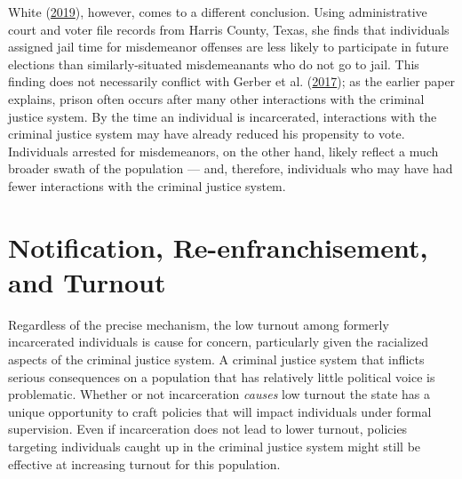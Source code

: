 \documentclass[
  12pt,
]{article}
\begin{document}
White (\protect\hyperlink{ref-White2019}{2019}), however, comes to a different conclusion. Using administrative court and voter file records from Harris County, Texas, she finds that individuals assigned jail time for misdemeanor offenses are less likely to participate in future elections than similarly-situated misdemeanants who do not go to jail. This finding does not necessarily conflict with Gerber et al. (\protect\hyperlink{ref-Gerber2017}{2017}); as the earlier paper explains, prison often occurs after many other interactions with the criminal justice system. By the time an individual is incarcerated, interactions with the criminal justice system may have already reduced his propensity to vote. Individuals arrested for misdemeanors, on the other hand, likely reflect a much broader swath of the population --- and, therefore, individuals who may have had fewer interactions with the criminal justice system.

\hypertarget{notification-re-enfranchisement-and-turnout}{%
\section*{Notification, Re-enfranchisement, and Turnout}\label{notification-re-enfranchisement-and-turnout}}

Regardless of the precise mechanism, the low turnout among formerly incarcerated individuals is cause for concern, particularly given the racialized aspects of the criminal justice system. A criminal justice system that inflicts serious consequences on a population that has relatively little political voice is problematic. Whether or not incarceration \emph{causes} low turnout the state has a unique opportunity to craft policies that will impact individuals under formal supervision. Even if incarceration does not lead to lower turnout, policies targeting individuals caught up in the criminal justice system might still be effective at increasing turnout for this population.
\end{document}
